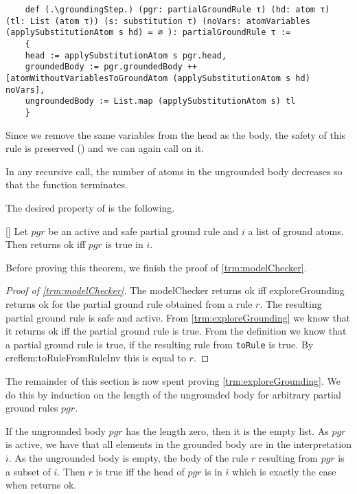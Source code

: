     \begin{lstlisting}
    def (.\groundingStep.) (pgr: partialGroundRule τ) (hd: atom τ) (tl: List (atom τ)) (s: substitution τ) (noVars: atomVariables (applySubstitutionAtom s hd) = ∅ ): partialGroundRule τ :=
    {
    head := applySubstitutionAtom s pgr.head,
    groundedBody := pgr.groundedBody ++ [atomWithoutVariablesToGroundAtom (applySubstitutionAtom s hd) noVars],
    ungroundedBody := List.map (applySubstitutionAtom s) tl
    }

    \end{lstlisting}

    Since we remove the same variables from the head as the body, the safety of this rule is preserved (\groundingStepPreservesSafety) and we can again call \exploreGrounding on it.

    In any recursive call, the number of atoms in the ungrounded body decreases so that the function terminates.

    The desired property of \exploreGrounding is the following.

    \begin{theorem}\label{trm:exploreGrounding}[\exploreGroundingSemantics]
        Let $pgr$ be an active and safe partial ground rule and $i$ a list of ground atoms. Then \exploreGrounding returns ok iff $pgr$ is true in $i$.
    \end{theorem}

    Before proving this theorem, we finish the proof of \cref{trm:modelChecker}.

    \begin{proof}[Proof of \cref{trm:modelChecker}]
        The modelChecker returns ok iff exploreGrounding returns ok for the partial ground rule obtained from a rule $r$. The resulting partial ground rule is safe and active. From \cref{trm:exploreGrounding} we know that it returns ok iff the partial ground rule is true. From the definition we know that a partial ground rule is true, if the resulting rule from \lstinline|toRule| is true. By cref{lem:toRuleFromRuleInv} this is equal to $r$.
    \end{proof}

    The remainder of this section is now spent proving \cref{trm:exploreGrounding}. We do this by induction on the length of the ungrounded body for arbitrary partial ground rules $pgr$.

    If the ungrounded body $pgr$ has the length zero, then it is the empty list. As $pgr$ is active, we have that all elements in the grounded body are in the interpretation $i$. As the ungrounded body is empty, the body of the rule $r$ resulting from $pgr$ is a subset of $i$. Then $r$ is true iff the head of $pgr$ is in $i$ which is exactly the case when \exploreGrounding returns ok.

